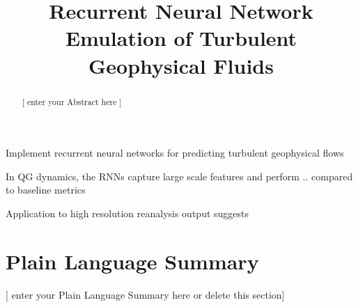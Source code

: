 \documentclass[draft]{agujournal2019}
\begin{document}
\title{Recurrent Neural Network Emulation of Turbulent Geophysical Fluids}

%
%





\begin{keypoints}
    \item Implement recurrent neural networks for predicting turbulent geophysical flows
    \item In QG dynamics, the RNNs capture large scale features and perform .. compared to baseline metrics
    \item Application to high resolution reanalysis output suggests
\end{keypoints}

%
%

\begin{abstract}
[ enter your Abstract here ]
\end{abstract}

\section*{Plain Language Summary}
[ enter your Plain Language Summary here or delete this section]
\end{document}

